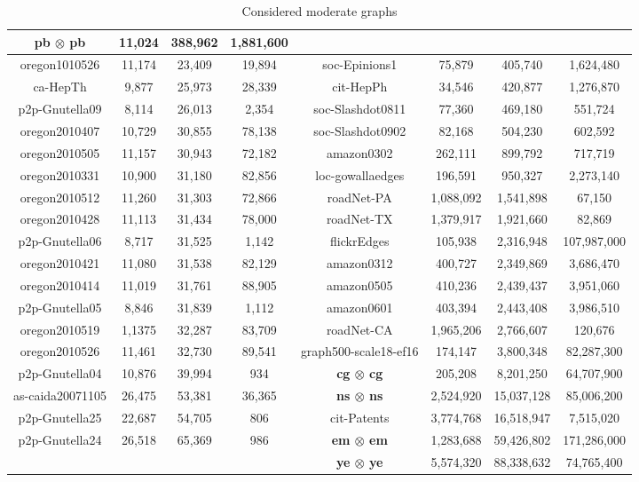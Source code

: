 \documentclass[10]{article}
\begin{document}
\begin{table}[htbp]
\begin{center}
\begin{tabular}{|c|c|c|c|c|c|c|c|}
\textbf{pb $\boldsymbol{\otimes}$ pb} & 11,024 & 388,962 & 1,881,600 \\
\hline
oregon1010526 & 11,174 & 23,409 & 19,894 & 
soc-Epinions1 & 75,879 & 405,740 & 1,624,480 \\
\hline
ca-HepTh & 9,877 & 25,973 & 28,339 & 
cit-HepPh & 34,546 & 420,877 & 1,276,870 \\
\hline
p2p-Gnutella09 & 8,114 & 26,013 & 2,354 & 
soc-Slashdot0811 & 77,360 & 469,180 & 551,724 \\
\hline
oregon2010407 & 10,729 & 30,855 & 78,138 & 
soc-Slashdot0902 & 82,168 & 504,230 & 602,592 \\
\hline
oregon2010505 & 11,157 & 30,943 & 72,182 & 
amazon0302 & 262,111 & 899,792 & 717,719 \\
\hline
oregon2010331 & 10,900 & 31,180 & 82,856 & 
loc-gowallaedges & 196,591 & 950,327 & 2,273,140 \\
\hline
oregon2010512 & 11,260 & 31,303 & 72,866 & 
roadNet-PA & 1,088,092 & 1,541,898 & 67,150 \\
\hline
oregon2010428 & 11,113 & 31,434 & 78,000 & 
roadNet-TX & 1,379,917 & 1,921,660 & 82,869 \\
\hline
p2p-Gnutella06 & 8,717 & 31,525 & 1,142 & 
flickrEdges & 105,938 & 2,316,948 & 107,987,000 \\
\hline
oregon2010421 & 11,080 & 31,538 & 82,129 & 
amazon0312 & 400,727 & 2,349,869 & 3,686,470 \\
\hline
oregon2010414 & 11,019 & 31,761 & 88,905 & 
amazon0505 & 410,236 & 2,439,437 & 3,951,060 \\
\hline
p2p-Gnutella05 & 8,846 & 31,839 & 1,112 & 
amazon0601 & 403,394 & 2,443,408 & 3,986,510 \\
\hline
oregon2010519 & 1,1375 & 32,287 & 83,709 & 
roadNet-CA & 1,965,206 & 2,766,607 & 120,676 \\
\hline
oregon2010526 & 11,461 & 32,730 & 89,541 & 
graph500-scale18-ef16 & 174,147 & 3,800,348 & 82,287,300 \\
\hline
p2p-Gnutella04 & 10,876 & 39,994 & 934 & 
\textbf{cg $\boldsymbol{\otimes}$ cg} & 205,208 & 8,201,250 & 64,707,900 \\
\hline
as-caida20071105 & 26,475 & 53,381 & 36,365 & 
\textbf{ns $\boldsymbol{\otimes}$ ns} & 2,524,920 & 15,037,128 & 85,006,200 \\
\hline
p2p-Gnutella25 & 22,687 & 54,705 & 806 & 
cit-Patents & 3,774,768 & 16,518,947 & 7,515,020 \\
\hline
p2p-Gnutella24 & 26,518 & 65,369 & 986 & 
\textbf{em $\boldsymbol{\otimes}$ em} & 1,283,688 & 59,426,802 & 171,286,000 \\
\hline
& & & & \textbf{ye $\boldsymbol{\otimes}$ ye} & 5,574,320 & 88,338,632 & 74,765,400 \\
\hline
\end{tabular}
\end{center}
\caption{Considered moderate graphs \label{tab:graphs}}
\end{table}
\end{document}
